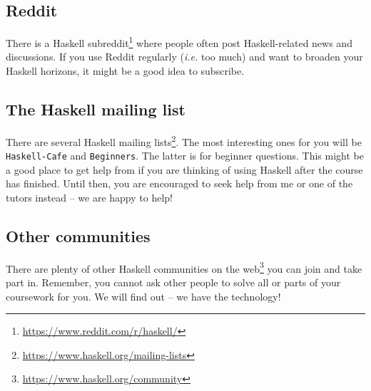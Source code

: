 \subsection{Reddit} 

There is a Haskell subreddit\footnote{\url{https://www.reddit.com/r/haskell/}} where people often post Haskell-related news and discussions. If you use Reddit regularly (\emph{i.e.} too much) and want to broaden your Haskell horizons, it might be a good idea to subscribe.

\subsection{The Haskell mailing list} 

There are several Haskell mailing lists\footnote{\url{https://www.haskell.org/mailing-lists}}. The most interesting ones for you will be \texttt{\small Haskell-Cafe} and \texttt{\small Beginners}. The latter is for beginner questions. This might be a good place to get help from if you are thinking of using Haskell after the course has finished. Until then, you are encouraged to seek help from me or one of the tutors instead -- we are happy to help! 

\subsection{Other communities} 

There are plenty of other Haskell communities on the web\footnote{\url{https://www.haskell.org/community}} you can join and take part in. Remember, you cannot ask other people to solve all or parts of your coursework for you. We will find out -- we have the technology!


